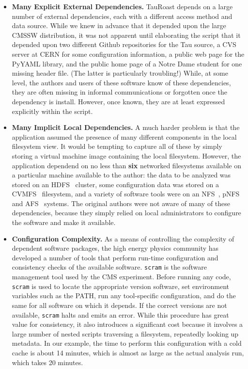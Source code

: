 \documentclass{sig-alternate}
\begin{document}
\begin{itemize}

\item {\bf Many Explicit External Dependencies.}  TauRoast depends on a large number of
external dependencies, each with a different access method and data source.
While we knew in advance that it depended upon the large CMSSW distribution,
it was not apparent until elaborating the script that it depended upon
two different Github repositories for the Tau source,
a CVS server at CERN for some configuration information, a public web page
for the PyYAML library, and the public home page of a Notre Dame student
for one missing header file.  (The latter is particularly troubling!)
While, at some level, the authors and users of these software know of these dependencies, they are often missing in
informal communications or forgotten once the dependency is install.
However, once known, they are at least expressed explicitly within the script.

\item {\bf Many Implicit Local Dependencies.} A much harder problem is that the
application assumed the presence of many different components in the local
filesystem view.  It would be tempting to capture all of these by simply
storing a virtual machine image containing the local filesystem.  However,
the application dependend on no less than {\bf six} networked filesystems
available on a particular machine available to the author:
the data to be analyzed was stored on an HDFS~\cite{hadoop} cluster,
some configuration data was stored on a CVMFS~\cite{cvmfs} filesystem,
and a variety of software tools were on an NFS~\cite{howard1988scale},
pNFS~\cite{welch2008scalable} and AFS~\cite{sandberg1985design} systems.
The original authors were not aware of many of these dependencies,
because they simply relied on local administrators to configure the
software and make it available.

\item {\bf Configuration Complexity.}  As a means of controlling the complexity
of dependent software packages, the high energy physics community has developed
a number of tools that perform run-time configuration and consistency checks
of the available software.  {\tt scram} is the software management tool used
by the CMS experiment.  Before running any code, {\tt scram} is used to locate
the appropriate version software,  set environment variables such as the PATH, run any
tool-specific configuration, and do the same for all software on which it depends.
If the correct versions are not available, {\tt scram} halts and emits an error.
While this procedure has great value for consistency, it also introduces a significant cost
because it involves a large number of nested scripts traversing a filesystem,
repeatedly looking up metadata.  In our example, the time to perform this configuration
with a cold cache is about 14 minutes, which is almost as large as the actual analysis
run, which takes 20 minutes.


\end{itemize}
\end{document}
